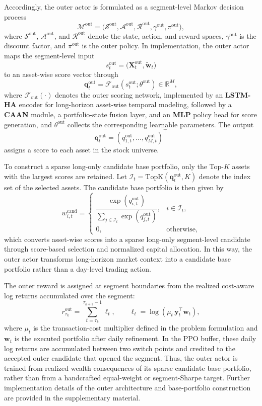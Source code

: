 \documentclass[letterpaper]{article} %
\begin{document}
Accordingly, the outer actor is formulated as a segment-level Markov decision process
\[
\mathcal{M}^{\mathrm{out}}
=
\bigl(
\mathcal{S}^{\mathrm{out}},
\mathcal{A}^{\mathrm{out}},
\mathcal{R}^{\mathrm{out}},
\gamma^{\mathrm{out}},
\pi^{\mathrm{out}}
\bigr),
\]
where \(\mathcal{S}^{\mathrm{out}}\), \(\mathcal{A}^{\mathrm{out}}\), and \(\mathcal{R}^{\mathrm{out}}\) denote the state, action, and reward spaces, \(\gamma^{\mathrm{out}}\) is the discount factor, and \(\pi^{\mathrm{out}}\) is the outer policy. In implementation, the outer actor maps the segment-level input
\[
s_{t}^{\mathrm{out}}
=
\bigl(
\mathbf{X}_{t}^{\mathrm{out}},
\tilde{\mathbf{w}}_{t}
\bigr)
\]
to an asset-wise score vector through
\[
\mathbf{q}_{t}^{\mathrm{out}}
=
\mathcal{F}_{\mathrm{out}}
\!\left(
s_{t}^{\mathrm{out}};
\theta^{\mathrm{out}}
\right)
\in\mathbb{R}^{M},
\]
where \(\mathcal{F}_{\mathrm{out}}(\cdot)\) denotes the outer scoring network, implemented by an \textbf{LSTM-HA} \citep{alphastock} encoder for long-horizon asset-wise temporal modeling, followed by a \textbf{CAAN} \citep{alphastock} module, a portfolio-state fusion layer, and an \textbf{MLP} policy head for score generation, and \(\theta^{\mathrm{out}}\) collects the corresponding learnable parameters. The output
\[
\mathbf{q}_{t}^{\mathrm{out}}
=
(q_{1,t}^{\mathrm{out}},\dots,q_{M,t}^{\mathrm{out}})^\top
\]
assigns a score to each asset in the stock universe.

To construct a sparse long-only candidate base portfolio, only the Top-\(K\) assets with the largest scores are retained. Let \(\mathcal{I}_{t}=\mathrm{TopK}(\mathbf{q}^{\mathrm{out}}_{t},K)\) denote the index set of the selected assets. The candidate base portfolio is then given by
\[
w_{i,t}^{\mathrm{cand}}
=
\begin{cases}
\dfrac{\exp(q_{i,t}^{\mathrm{out}})}
{\sum_{j\in\mathcal{I}_{t}}
\exp(q_{j,t}^{\mathrm{out}})},
& i\in\mathcal{I}_{t},\\[10pt]
0, & \text{otherwise},
\end{cases}
\]
which converts asset-wise scores into a sparse long-only segment-level candidate through score-based selection and normalized capital allocation. In this way, the outer actor transforms long-horizon market context into a candidate base portfolio rather than a day-level trading action.

The outer reward is assigned at segment boundaries from the realized cost-aware log returns accumulated over the segment:
\[
r^{\mathrm{out}}_{\tau_k}
=
\sum_{t=\tau_k}^{\tau_{k+1}-1}
\ell_t,
\qquad
\ell_t=\log\!\left(\mu_t\,\mathbf{y}_t^\top\mathbf{w}_t\right),
\]
where \(\mu_t\) is the transaction-cost multiplier defined in the problem formulation and \(\mathbf{w}_t\) is the executed portfolio after daily refinement. In the PPO buffer, these daily log returns are accumulated between two switch points and credited to the accepted outer candidate that opened the segment. Thus, the outer actor is trained from realized wealth consequences of its sparse candidate base portfolio, rather than from a handcrafted equal-weight or segment-Sharpe target. Further implementation details of the outer architecture and base-portfolio construction are provided in the supplementary material.
\end{document}

